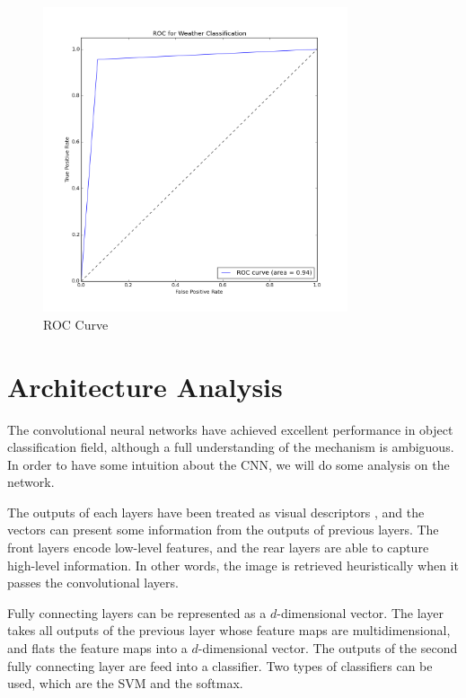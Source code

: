 \begin{figure}[!htb]
    \centering
	\includegraphics[width=0.8\textwidth]{ROCWeatherClassification.png}
    \caption{ROC Curve}%
    \label{fig:WeatherClassificationROC}%
\end{figure}

\section{Architecture Analysis}

The convolutional neural networks have achieved excellent performance in object classification field, although a full understanding of the mechanism is ambiguous. In order to have some intuition about the CNN, we will do some analysis on the network.

The outputs of each layers have been treated as visual descriptors \citep{razavian2014cnn}, and the vectors can present some information from the outputs of previous layers. The front layers encode low-level features, and the rear layers are able to capture high-level information. In other words, the image is retrieved heuristically when it passes the convolutional layers.

Fully connecting layers can be represented as a $d$-dimensional vector. The layer takes all outputs of the previous layer  whose feature maps are multidimensional, and flats the feature maps into a $d$-dimensional vector. The outputs of the second fully connecting layer are feed into a classifier. Two types of classifiers can be used, which are the SVM and the softmax.

